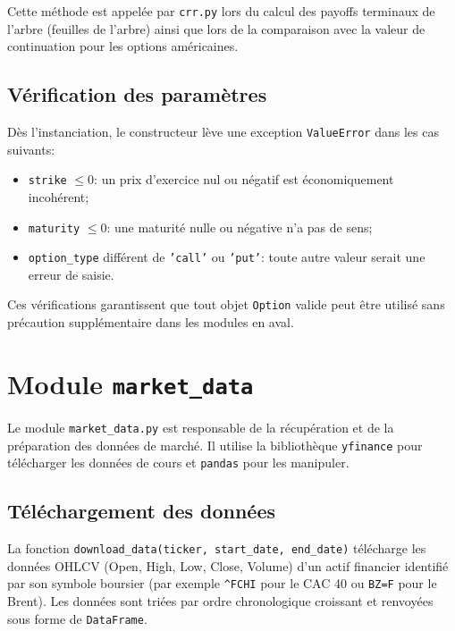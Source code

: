 \documentclass[11pt]{report}
\begin{document}
Cette méthode est appelée par \texttt{crr.py} lors du calcul des payoffs
terminaux de l'arbre (feuilles de l'arbre) ainsi que lors de la comparaison
avec la valeur de continuation pour les options américaines.

\subsection{Vérification des paramètres}

Dès l'instanciation, le constructeur lève une exception \texttt{ValueError}
dans les cas suivants:
\begin{itemize}
    \item \texttt{strike} $\leq 0$: un prix d'exercice nul ou négatif est économiquement incohérent;
    \item \texttt{maturity} $\leq 0$: une maturité nulle ou négative n'a pas de sens;
    \item \texttt{option\_type} différent de \texttt{'call'} ou \texttt{'put'}: toute autre valeur
    serait une erreur de saisie.
\end{itemize}

Ces vérifications garantissent que tout objet \texttt{Option} valide peut être
utilisé sans précaution supplémentaire dans les modules en aval.

\section{Module \texttt{market\_data}}

Le module \texttt{market\_data.py} est responsable de la récupération et de la
préparation des données de marché. Il utilise la bibliothèque \texttt{yfinance}
pour télécharger les données de cours et \texttt{pandas} pour les manipuler.

\subsection{Téléchargement des données}

La fonction \texttt{download\_data(ticker, start\_date, end\_date)} télécharge
les données OHLCV (Open, High, Low, Close, Volume) d'un actif financier
identifié par son symbole boursier (par exemple \texttt{\^{}FCHI} pour le CAC 40
ou \texttt{BZ=F} pour le Brent). Les données sont triées par ordre chronologique
croissant et renvoyées sous forme de \texttt{DataFrame}.
\end{document}

